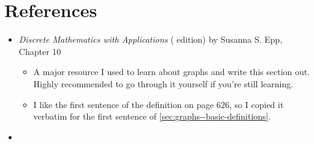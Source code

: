 \section{References}
\begin{itemize}
    \item \emph{Discrete Mathematics with Applications} ( edition) by Susanna S. Epp, Chapter 10
    \begin{itemize}
        \item A major resource I used to learn about graphs and write this section out. Highly recommended to go through it yourself if you're still learning.
        \item I like the first sentence of the definition on page $626$, so I copied it verbatim for the first sentence of \cref{sec:graphs--basic-definitions}.
    \end{itemize}
    \item \href{https://en.wikipedia.org/wiki/Graph_(discrete_mathematics)}{}
\end{itemize}

